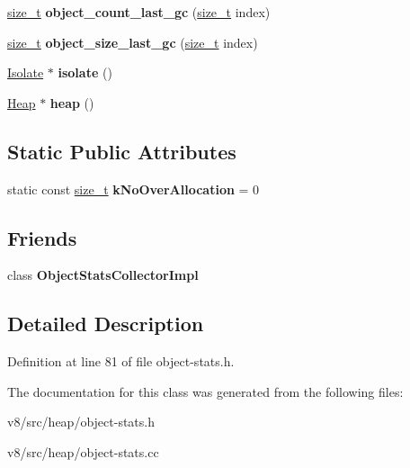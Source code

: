 \begin{DoxyCompactItemize}
\mbox{\label{classv8_1_1internal_1_1ObjectStats_a5ec04aaae37dc25b78fb2d31c304a6f4}} 
\mbox{\hyperlink{classsize__t}{size\+\_\+t}} {\bfseries object\+\_\+count\+\_\+last\+\_\+gc} (\mbox{\hyperlink{classsize__t}{size\+\_\+t}} index)
\item 
\mbox{\label{classv8_1_1internal_1_1ObjectStats_a6deab872b4cb2141896cf6aa7bd534ed}} 
\mbox{\hyperlink{classsize__t}{size\+\_\+t}} {\bfseries object\+\_\+size\+\_\+last\+\_\+gc} (\mbox{\hyperlink{classsize__t}{size\+\_\+t}} index)
\item 
\mbox{\label{classv8_1_1internal_1_1ObjectStats_a0247bdf90938829a43fe8651d6728b8b}} 
\mbox{\hyperlink{classv8_1_1internal_1_1Isolate}{Isolate}} $\ast$ {\bfseries isolate} ()
\item 
\mbox{\label{classv8_1_1internal_1_1ObjectStats_a1f41356a8c70a8d667afece96c3dc6e4}} 
\mbox{\hyperlink{classv8_1_1internal_1_1Heap}{Heap}} $\ast$ {\bfseries heap} ()
\end{DoxyCompactItemize}
\subsection*{Static Public Attributes}
\begin{DoxyCompactItemize}
\item 
\mbox{\label{classv8_1_1internal_1_1ObjectStats_aba9b0289a5eb470a08ef7d9d1270941a}} 
static const \mbox{\hyperlink{classsize__t}{size\+\_\+t}} {\bfseries k\+No\+Over\+Allocation} = 0
\end{DoxyCompactItemize}
\subsection*{Friends}
\begin{DoxyCompactItemize}
\item 
\mbox{\label{classv8_1_1internal_1_1ObjectStats_adf0f463317c85def21589c13485e0170}} 
class {\bfseries Object\+Stats\+Collector\+Impl}
\end{DoxyCompactItemize}


\subsection{Detailed Description}


Definition at line 81 of file object-\/stats.\+h.



The documentation for this class was generated from the following files\+:\begin{DoxyCompactItemize}
\item 
v8/src/heap/object-\/stats.\+h\item 
v8/src/heap/object-\/stats.\+cc\end{DoxyCompactItemize}
